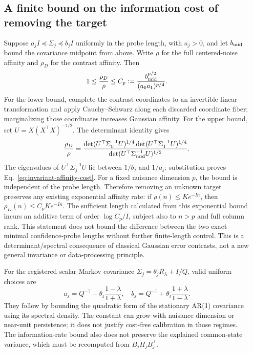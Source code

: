 \subsection{A finite bound on the information cost of removing the target}
Suppose $a_jI\preceq\Sigma_j\preceq b_jI$ uniformly in the probe length, with $a_j>0$, and let $b_{\rm mid}$ bound the covariance midpoint from above.
Write $\rho$ for the full centered-noise affinity and $\rho_D$ for the contrast affinity.
Then
\begin{equation}
1\le\frac{\rho_D}{\rho}
\le C_p:=\frac{b_{\rm mid}^{p/2}}{(a_0a_1)^{p/4}}.
\label{eq:invariant-affinity-cost}
\end{equation}
For the lower bound, complete the contrast coordinates to an invertible linear transformation and apply Cauchy--Schwarz along each discarded coordinate fiber; marginalizing those coordinates increases Gaussian affinity.
For the upper bound, set $U=X(X^\top X)^{-1/2}$.
The determinant identity gives
\[
\frac{\rho_D}{\rho}=
\frac{\det(U^\top\Sigma_0^{-1}U)^{1/4}
\det(U^\top\Sigma_1^{-1}U)^{1/4}}
{\det(U^\top\Sigma_{\rm mid}^{-1}U)^{1/2}}.
\]
The eigenvalues of $U^\top\Sigma_j^{-1}U$ lie between $1/b_j$ and $1/a_j$; substitution proves Eq.~\eqref{eq:invariant-affinity-cost}.
For a fixed nuisance dimension $p$, the bound is independent of the probe length.
Therefore removing an unknown target preserves any existing exponential affinity rate: if $\rho(n)\le Ke^{-In}$, then $\rho_D(n)\le C_pKe^{-In}$.
The sufficient length calculated from this exponential bound incurs an additive term of order $\log C_p/I$, subject also to $n>p$ and full column rank.
This statement does not bound the difference between the two exact minimal confidence-probe lengths without further finite-length control.
This is a determinant/spectral consequence of classical Gaussian error contrasts, not a new general invariance or data-processing principle.

For the registered scalar Markov covariance $\Sigma_j=\theta_jR_\lambda+I/Q$, valid uniform choices are
\[
a_j=Q^{-1}+\theta_j\frac{1-\lambda}{1+\lambda},\quad
b_j=Q^{-1}+\theta_j\frac{1+\lambda}{1-\lambda}.
\]
They follow by bounding the quadratic form of the stationary AR(1) covariance using its spectral density.
The constant can grow with nuisance dimension or near-unit persistence; it does not justify cost-free calibration in those regimes.
The information-rate bound also does not preserve the explained common-state variance, which must be recomputed from $B_j\Pi_jB_j^\top$.

